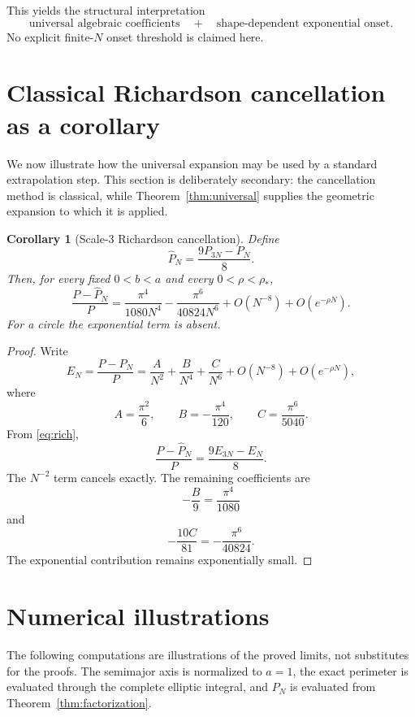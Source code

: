 \documentclass[11pt]{article}
\newtheorem{corollary}[theorem]{Corollary}
\theoremstyle{definition}
\numberwithin{equation}{section}
\begin{document}
This yields the structural interpretation
\[
\boxed{
\text{universal algebraic coefficients}
\quad+\quad
\text{shape-dependent exponential onset}.
}
\]
No explicit finite-\(N\) onset threshold is claimed here.

\section{Classical Richardson cancellation as a corollary}

We now illustrate how the universal expansion may be used by a standard
extrapolation step.  This section is deliberately secondary: the
cancellation method is classical, while Theorem~\ref{thm:universal}
supplies the geometric expansion to which it is applied.

\begin{corollary}[Scale-\(3\) Richardson cancellation]
\label{cor:richardson}
Define
\begin{equation}
\label{eq:rich}
\widehat P_N
=
\frac{9P_{3N}-P_N}{8}.
\end{equation}
Then, for every fixed \(0<b<a\) and every \(0<\rho<\rho_*\),
\begin{equation}
\label{eq:richerror}
\boxed{
\frac{P-\widehat P_N}{P}
=
\frac{\pi^4}{1080N^4}
-
\frac{\pi^6}{40824N^6}
+
O(N^{-8})
+
O(e^{-\rho N}).
}
\end{equation}
For a circle the exponential term is absent.
\end{corollary}

\begin{proof}
Write
\[
E_N=\frac{P-P_N}{P}
=
\frac{A}{N^2}
+\frac{B}{N^4}
+\frac{C}{N^6}
+O(N^{-8})
+O(e^{-\rho N}),
\]
where
\[
A=\frac{\pi^2}{6},
\qquad
B=-\frac{\pi^4}{120},
\qquad
C=\frac{\pi^6}{5040}.
\]
From \eqref{eq:rich},
\[
\frac{P-\widehat P_N}{P}
=
\frac{9E_{3N}-E_N}{8}.
\]
The \(N^{-2}\) term cancels exactly.  The remaining coefficients are
\[
-\frac{B}{9}
=
\frac{\pi^4}{1080}
\]
and
\[
-\frac{10C}{81}
=
-\frac{\pi^6}{40824}.
\]
The exponential contribution remains exponentially small.
\end{proof}

\section{Numerical illustrations}

The following computations are illustrations of the proved limits, not
substitutes for the proofs.  The semimajor axis is normalized to
\(a=1\), the exact perimeter is evaluated through the complete elliptic
integral, and \(P_N\) is evaluated from Theorem~\ref{thm:factorization}.
\end{document}
